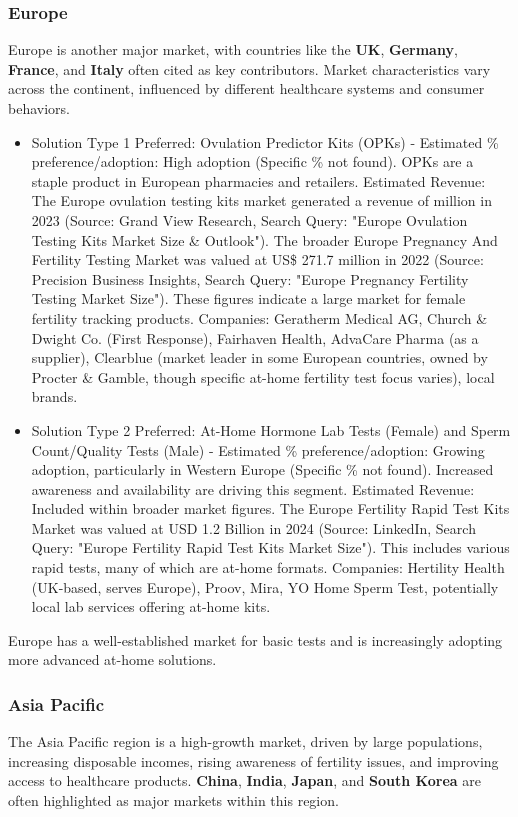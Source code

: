 \documentclass{article}
\begin{document}
\subsubsection{Europe}
Europe is another major market, with countries like the \textbf{UK}, \textbf{Germany}, \textbf{France}, and \textbf{Italy} often cited as key contributors. Market characteristics vary across the continent, influenced by different healthcare systems and consumer behaviors.

\begin{itemize}
  \item Solution Type 1 Preferred: Ovulation Predictor Kits (OPKs) - Estimated \% preference/adoption: High adoption (Specific \% not found). OPKs are a staple product in European pharmacies and retailers.
    Estimated Revenue: The Europe ovulation testing kits market generated a revenue of  million in 2023 (Source: Grand View Research, Search Query: "Europe Ovulation Testing Kits Market Size \& Outlook"). The broader Europe Pregnancy And Fertility Testing Market was valued at US\$ 271.7 million in 2022 (Source: Precision Business Insights, Search Query: "Europe Pregnancy Fertility Testing Market Size"). These figures indicate a large market for female fertility tracking products.
    Companies: Geratherm Medical AG, Church \& Dwight Co. (First Response), Fairhaven Health, AdvaCare Pharma (as a supplier), Clearblue (market leader in some European countries, owned by Procter \& Gamble, though specific at-home fertility test focus varies), local brands.
  \item Solution Type 2 Preferred: At-Home Hormone Lab Tests (Female) and Sperm Count/Quality Tests (Male) - Estimated \% preference/adoption: Growing adoption, particularly in Western Europe (Specific \% not found). Increased awareness and availability are driving this segment.
    Estimated Revenue: Included within broader market figures. The Europe Fertility Rapid Test Kits Market was valued at USD 1.2 Billion in 2024 (Source: LinkedIn, Search Query: "Europe Fertility Rapid Test Kits Market Size"). This includes various rapid tests, many of which are at-home formats.
    Companies: Hertility Health (UK-based, serves Europe), Proov, Mira, YO Home Sperm Test, potentially local lab services offering at-home kits.
\end{itemize}
Europe has a well-established market for basic tests and is increasingly adopting more advanced at-home solutions.

\subsubsection{Asia Pacific}
The Asia Pacific region is a high-growth market, driven by large populations, increasing disposable incomes, rising awareness of fertility issues, and improving access to healthcare products. \textbf{China}, \textbf{India}, \textbf{Japan}, and \textbf{South Korea} are often highlighted as major markets within this region.
\end{document}
